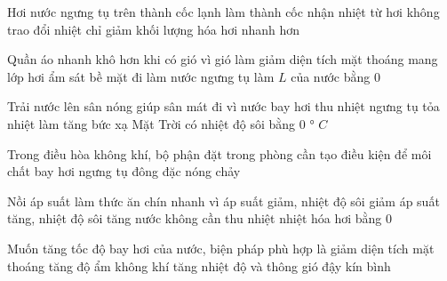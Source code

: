 \begin{ex}
Hơi nước ngưng tụ trên thành cốc lạnh làm thành cốc
\choice
{\True nhận nhiệt từ hơi}
{không trao đổi nhiệt}
{chỉ giảm khối lượng}
{hóa hơi nhanh hơn}
\end{ex}

\begin{ex}
Quần áo nhanh khô hơn khi có gió vì gió
\choice
{làm giảm diện tích mặt thoáng}
{\True mang lớp hơi ẩm sát bề mặt đi}
{làm nước ngưng tụ}
{làm $L$ của nước bằng 0}
\end{ex}

\begin{ex}
Trải nước lên sân nóng giúp sân mát đi vì nước
\choice
{\True bay hơi thu nhiệt}
{ngưng tụ tỏa nhiệt}
{làm tăng bức xạ Mặt Trời}
{có nhiệt độ sôi bằng 0 ° $C$}
\end{ex}

\begin{ex}
Trong điều hòa không khí, bộ phận đặt trong phòng cần tạo điều kiện để môi chất
\choice
{\True bay hơi}
{ngưng tụ}
{đông đặc}
{nóng chảy}
\end{ex}

\begin{ex}
Nồi áp suất làm thức ăn chín nhanh vì
\choice
{áp suất giảm, nhiệt độ sôi giảm}
{\True áp suất tăng, nhiệt độ sôi tăng}
{nước không cần thu nhiệt}
{nhiệt hóa hơi bằng 0}
\end{ex}

\begin{ex}
Muốn tăng tốc độ bay hơi của nước, biện pháp phù hợp là
\choice
{giảm diện tích mặt thoáng}
{tăng độ ẩm không khí}
{\True tăng nhiệt độ và thông gió}
{đậy kín bình}
\end{ex}

